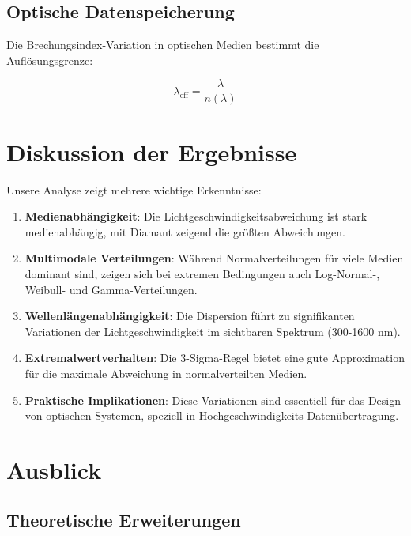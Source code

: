\documentclass[12pt,a4paper,oneside]{article}
\theoremstyle{definition}
\theoremstyle{remark}
\begin{document}
\subsection{Optische Datenspeicherung}

Die Brechungsindex-Variation in optischen Medien bestimmt die Auflösungsgrenze:

\begin{equation}
    \lambda_{\text{eff}} = \frac{\lambda}{n(\lambda)}
\end{equation}

\section{Diskussion der Ergebnisse}

Unsere Analyse zeigt mehrere wichtige Erkenntnisse:

\begin{enumerate}
    \item \textbf{Medienabhängigkeit}: Die Lichtgeschwindigkeitsabweichung ist stark medienabhängig, mit Diamant zeigend die größten Abweichungen.
    
    \item \textbf{Multimodale Verteilungen}: Während Normalverteilungen für viele Medien dominant sind, zeigen sich bei extremen Bedingungen auch Log-Normal-, Weibull- und Gamma-Verteilungen.
    
    \item \textbf{Wellenlängenabhängigkeit}: Die Dispersion führt zu signifikanten Variationen der Lichtgeschwindigkeit im sichtbaren Spektrum (300-1600 nm).
    
    \item \textbf{Extremalwertverhalten}: Die 3-Sigma-Regel bietet eine gute Approximation für die maximale Abweichung in normalverteilten Medien.
    
    \item \textbf{Praktische Implikationen}: Diese Variationen sind essentiell für das Design von optischen Systemen, speziell in Hochgeschwindigkeits-Datenübertragung.
\end{enumerate}

\section{Ausblick}

\subsection{Theoretische Erweiterungen}
\end{document}

